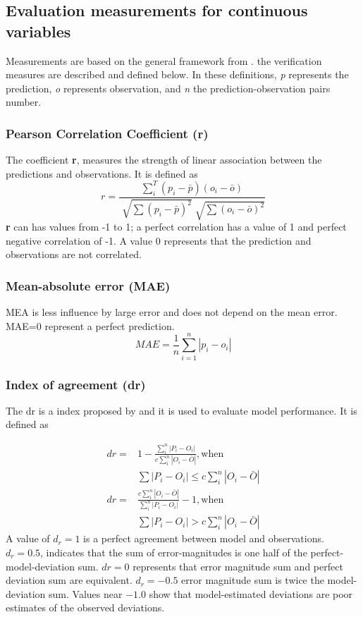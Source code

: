\subsection{Evaluation measurements for continuous variables}
Measurements are based on the general framework from \cite{Murphy1987}. the verification measures are described and defined below. In these definitions, \textsl{p} represents the prediction, \textsl{o} represents observation, and \textsl{n} the prediction-observation pairs number.
\subsubsection{Pearson Correlation Coefficient (\textbf{r})}
The coefficient \textbf{r}, measures the strength of linear association between the predictions and observations. It is defined as
\begin{equation}
r=\frac{\sum_i^T (p_i-\bar{p})(o_i-\bar{o})}
{\sqrt[]{\sum(p_i-\bar{p})^2} \sqrt[]{\sum(o_i-\bar{o})^2}} 
\label{pr}
\end{equation}
\textbf{r} can has values from -1 to 1; a perfect correlation has a value of 1 and perfect negative correlation of -1. A value 0 represents that the prediction and observations are not correlated.

\subsubsection{Mean-absolute error (MAE)}
MEA is less influence by large error and does not depend on the mean error. MAE=0 represent a perfect prediction.
\begin{equation}
MAE=\frac{1}{n}\sum_{i=1}^n|p_i-o_i|
\label{mae}
\end{equation}

\subsubsection{Index of agreement (dr)}
The dr is a index proposed by \cite{willmott2012refined} and it is used to evaluate model performance. It is defined as

\begin{eqnarray}
dr=&1-\frac{\sum_i^n|P_i-O_i|}{c\sum_i^n|O_i-\bar{O}|},\textrm{when}\\
 &\sum|P_i-O_i|\leq c\sum_i^n|O_i-\bar{O}|\nonumber
\label{dr}
\end{eqnarray}
\begin{eqnarray}
dr=&\frac{c\sum_i^n|O_i-\bar{O}|}{\sum_i^n|P_i-O_i|}-1,\textrm{when}\\
 &\sum|P_i-O_i| > c\sum_i^n|O_i-\bar{O}|\nonumber
\label{dr1}
\end{eqnarray}
A value of $d_r=1$ is a perfect agreement between model and observations. $d_r=0.5$, indicates that the sum of error-magnitudes is one half of the perfect-model-deviation sum. $dr=0$ represents that error magnitude sum and perfect deviation sum are equivalent. $d_r=-0.5$ error magnitude sum is twice the model-deviation sum. Values near $-1.0$ show that model-estimated deviations are poor estimates of the observed deviations.
